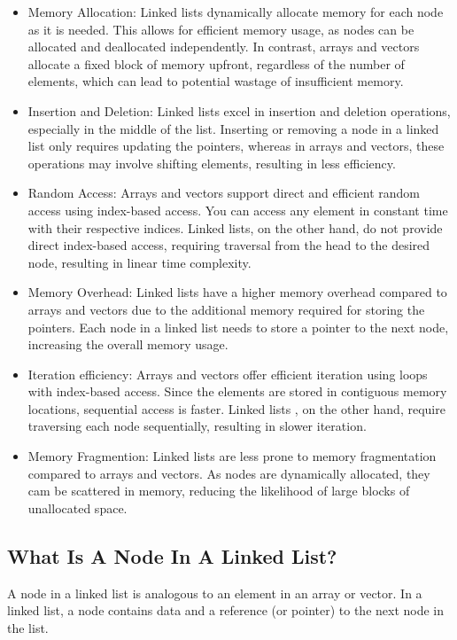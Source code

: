 \documentclass[a4paper,9pt]{article}
\begin{document}
\begin{itemize}
    \item Memory Allocation: Linked lists dynamically allocate memory for each node as it is needed. This 
allows for efficient memory
    usage, as nodes can be allocated and deallocated independently. In contrast, arrays and vectors allocate 
a fixed block of memory
    upfront, regardless of the number of elements, which can lead to potential wastage of insufficient 
memory.
    \item Insertion and Deletion: Linked lists excel in insertion and deletion operations, especially in the 
middle of the list. Inserting
    or removing a node in a linked list only requires updating the pointers, whereas in arrays and vectors, 
these operations may involve
    shifting elements, resulting in less efficiency.
    \item Random Access: Arrays and vectors support direct and efficient random access using index-based 
access. You can access any element
    in constant time with their respective indices. Linked lists, on the other hand, do not provide direct 
index-based access, requiring traversal
    from the head to the desired node, resulting in linear time complexity.
    \item Memory Overhead: Linked lists have a higher memory overhead compared to arrays and vectors due to 
the additional memory required for storing
    the pointers. Each node in a linked list needs to store a pointer to the next node, increasing the 
overall memory usage.
    \item Iteration efficiency: Arrays and vectors offer efficient iteration using loops with index-based 
access. Since the elements are stored in
    contiguous memory locations, sequential access is faster. Linked lists , on the other hand, require 
traversing each node sequentially, resulting in
    slower iteration.
    \item Memory Fragmention: Linked lists are less prone to memory fragmentation compared to arrays and 
vectors. As nodes are dynamically allocated, they
    cam be scattered in memory, reducing the likelihood of large blocks of unallocated space.
\end{itemize}

\subsection*{What Is A Node In A Linked List?}

A node in a linked list is analogous to an element in an array or vector. In a linked list, a node contains 
data and a reference (or pointer) to the next node in the list.
\end{document}
